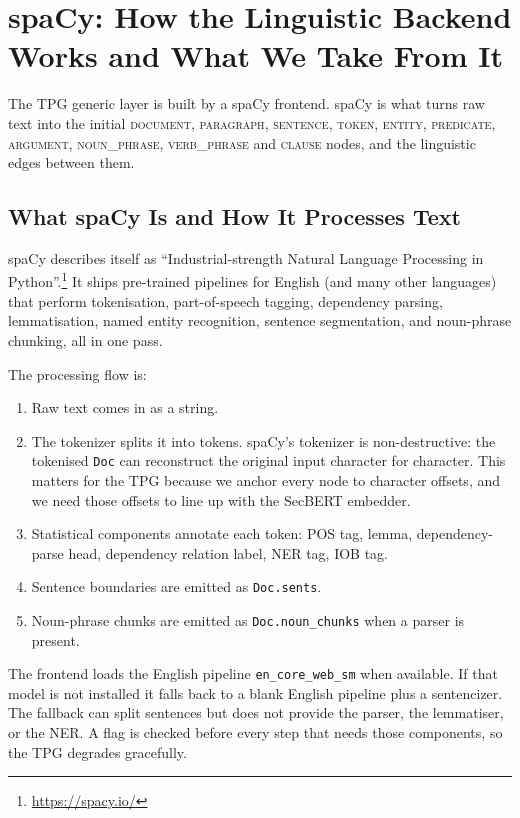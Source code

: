 \documentclass[11pt]{article}
\begin{document}
\section{spaCy: How the Linguistic Backend Works and What We Take From It}

The TPG generic layer is built by a spaCy frontend. spaCy is what
turns raw text into the initial \textsc{document}, \textsc{paragraph},
\textsc{sentence}, \textsc{token}, \textsc{entity}, \textsc{predicate},
\textsc{argument}, \textsc{noun\_phrase}, \textsc{verb\_phrase} and
\textsc{clause} nodes, and the linguistic edges between them.

\subsection{What spaCy Is and How It Processes Text}

spaCy describes itself as ``Industrial-strength Natural Language
Processing in Python''.\footnote{\url{https://spacy.io/}} It ships
pre-trained pipelines for English (and many other languages) that
perform tokenisation, part-of-speech tagging, dependency parsing,
lemmatisation, named entity recognition, sentence segmentation, and
noun-phrase chunking, all in one pass.

The processing flow is:

\begin{enumerate}
    \item Raw text comes in as a string.
    \item The tokenizer splits it into tokens. spaCy's tokenizer is
    non-destructive: the tokenised \texttt{Doc} can reconstruct the
    original input character for character. This matters for the TPG
    because we anchor every node to character offsets, and we need
    those offsets to line up with the SecBERT embedder.
    \item Statistical components annotate each token: POS tag, lemma,
    dependency-parse head, dependency relation label, NER tag, IOB tag.
    \item Sentence boundaries are emitted as \texttt{Doc.sents}.
    \item Noun-phrase chunks are emitted as \texttt{Doc.noun\_chunks}
    when a parser is present.
\end{enumerate}

The frontend loads the English pipeline \texttt{en\_core\_web\_sm}
when available. If that model is not installed it falls back to a
blank English pipeline plus a sentencizer. The fallback can split
sentences but does not provide the parser, the lemmatiser, or the
NER. A flag is checked before every step that needs those components,
so the TPG degrades gracefully.
\end{document}
